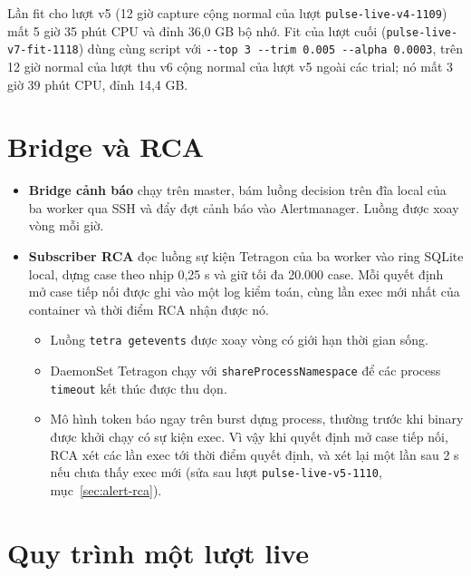 Lần fit cho lượt v5 (12 giờ capture cộng normal của lượt \texttt{pulse-\allowbreak{}live-\allowbreak{}v4-\allowbreak{}1109}) mất 5 giờ 35 phút CPU và đỉnh 36,0 GB bộ nhớ. Fit của lượt cuối (\texttt{pulse-\allowbreak{}live-\allowbreak{}v7-\allowbreak{}fit-\allowbreak{}1118}) dùng cùng script với \texttt{-\allowbreak{}-top 3 -\allowbreak{}-trim 0.005 -\allowbreak{}-alpha 0.0003}, trên 12 giờ normal của lượt thu v6 cộng normal của lượt v5 ngoài các trial; nó mất 3 giờ 39 phút CPU, đỉnh 14,4 GB.

\section{Bridge và RCA}

\begin{itemize}
\tightlist
\item
  \textbf{Bridge cảnh báo} chạy trên master, bám luồng decision trên đĩa local của ba worker qua SSH và đẩy đợt cảnh báo vào Alertmanager. Luồng được xoay vòng mỗi giờ.
\item
  \textbf{Subscriber RCA} đọc luồng sự kiện Tetragon của ba worker vào ring SQLite local, dựng case theo nhịp 0,25 s và giữ tối đa 20.000 case. Mỗi quyết định mở case tiếp nối được ghi vào một log kiểm toán, cùng lần exec mới nhất của container và thời điểm RCA nhận được nó.

  \begin{itemize}
  \tightlist
  \item
    Luồng \texttt{tetra\ getevents} được xoay vòng có giới hạn thời gian sống.
  \item
    DaemonSet Tetragon chạy với \texttt{shareProcessNamespace} để các process \texttt{timeout} kết thúc được thu dọn.
  \item
    Mô hình token báo ngay trên burst dựng process, thường trước khi binary được khởi chạy có sự kiện exec. Vì vậy khi quyết định mở case tiếp nối, RCA xét các lần exec tới thời điểm quyết định, và xét lại một lần sau 2 s nếu chưa thấy exec mới (sửa sau lượt \texttt{pulse-\allowbreak{}live-\allowbreak{}v5-\allowbreak{}1110}, mục~\ref{sec:alert-rca}).
  \end{itemize}
\end{itemize}

\section{Quy trình một lượt live}

